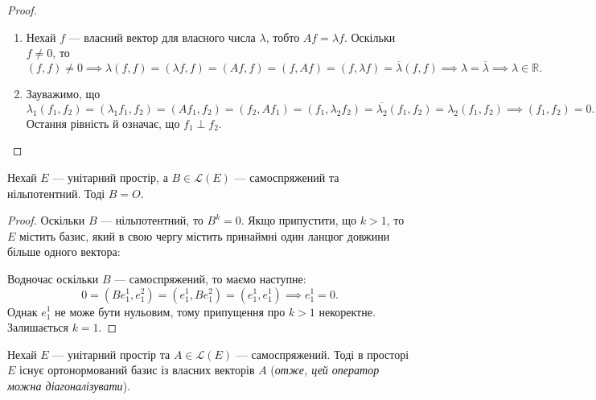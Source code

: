 \documentclass{math_library}
\begin{document}
\begin{proof}
\begin{enumerate}[topsep=0pt, wide=0pt, label={\arabic*)}]
\item Нехай $f$ --- власний вектор для власного числа $\lambda$, тобто $Af = \lambda f$. Оскільки $f \neq 0$, то
\[ 
(f,f) \neq 0 \implies \lambda (f,f) = (\lambda f, f) = (Af,f) = (f,Af) = (f, \lambda f) = \overline{\lambda} (f,f) \implies \lambda = \overline{\lambda} \implies \lambda \in \mathbb{R}.
\]
\item Зауважимо, що
\[
\lambda_1 (f_1,f_2) = (\lambda_1 f_1, f_2) = (Af_1, f_2) = (f_2, Af_1) = (f_1, \lambda_2 f_2) = \overline{\lambda_2} (f_1,f_2) = \lambda_2 (f_1,f_2) \implies (f_1,f_2) = 0.
\]
Остання рівність й означає, що $f_1 \perp f_2$. \qedhere
\end{enumerate}
\end{proof}

\begin{theorem}
Нехай $E$ --- унітарний простір, а $B \in \mathcal{L}(E)$ --- самоспряжений та нільпотентний. Тоді $B = O$.
\end{theorem}

\begin{proof}
Оскільки $B$ --- нільпотентний, то $B^k = 0$. Якщо припустити, що $k > 1$, то $E$ містить базис, який в свою чергу містить принаймні один ланцюг довжини більше одного вектора:
\begin{figure}[H]
\centering
{}
\end{figure}
Водночас оскільки $B$ --- самоспряжений, то маємо наступне:
\[
0 = (Be_1^1,e_1^2) = (e_1^1,Be_1^2) = (e_1^1,e_1^1) \implies e_1^1 = 0.
\]
Однак $e_1^1$ не може бути нульовим, тому припущення про $k > 1$ некоректне. Залишається $k = 1$.
\end{proof}

\begin{theorem}
Нехай $E$ --- унітарний простір та $A \in \mathcal{L}(E)$ --- самоспряжений. Тоді в просторі $E$ існує ортонормований базис із власних векторів $A$ (\textit{отже, цей оператор можна діагоналізувати}).
\end{theorem}
\end{document}
